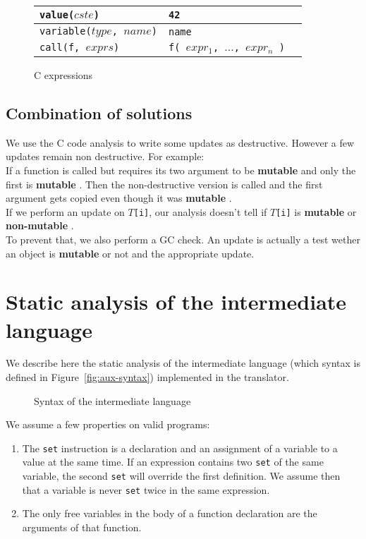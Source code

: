 \documentclass[12pt,a4paper]{article}
\newcommand{\cl}[1]{\texttt{#1}}
\newcommand{\mut}{  \textbf{ mutable } }
\newcommand{\nmut}{ \textbf{ non-mutable } }
\begin{document}
\begin{figure}[!ht]
\begin{tabular}{|p{50mm}|p{50mm}|p{50mm}|}
\hline
\cl{value($cste$)} & \cl{42} & \\ \hline
\cl{variable($type$, $name$)} & \cl{name} & \\ \hline
\cl{call(f, $exprs$)} & \cl{f( $expr_1$, $...$, $expr_n$ )} & \\ \hline
\end{tabular}
\caption{C expressions}
\end{figure}




\subsection{Combination of solutions}

We use the C code analysis to write some updates as destructive. However a few updates remain non destructive. For example:\\

If a function is called but requires its two argument to be \mut  and only the first is \mut. Then the non-destructive version is called and the first argument gets copied even though it was \mut.\\

If we perform an update on \cl{$T$[i]}, our analysis doesn't tell if \cl{$T$[i]} is \mut or \nmut.\\

To prevent that, we also perform a GC check. An update is actually a test wether an object is \mut or not and the appropriate update.






\newpage
\section{Static analysis of the intermediate language}
\label{sec:StaticAnal}

We describe here the static analysis of the intermediate language (which syntax is defined in Figure~\ref{fig:aux-syntax}) implemented in the translator.

\begin{figure}[!ht]

\caption{Syntax of the intermediate language}
\end{figure}

We assume a few properties on valid programs:
\begin{enumerate}
\item The \cl{set} instruction is a declaration and an assignment of a variable to a value at the same time. If an expression contains two \cl{set} of the same variable, the second \cl{set} will override the first definition. We assume then that a variable is never \cl{set} twice in the same expression.
\item The only free variables in the body of a function declaration are the arguments of that function.
\end{enumerate}
\end{document}

